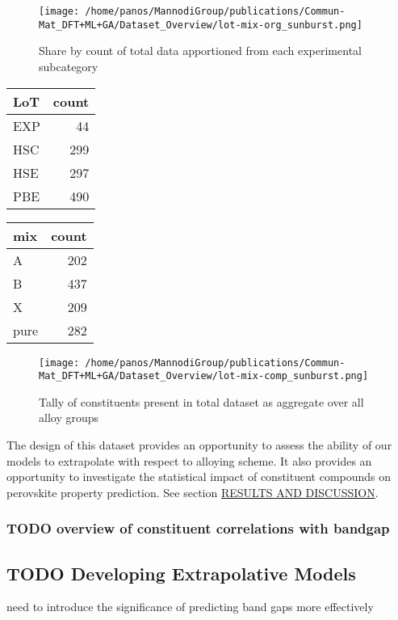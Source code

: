 \documentclass[aip, jmp, amsmath, amssymb]{revtex4-2}
\begin{document}
\begin{figure*}
\centering
\texttt{[image: /home/panos/MannodiGroup/publications/Commun-Mat\_DFT+ML+GA/Dataset\_Overview/lot-mix-org\_sunburst.png]}
\caption{\label{fig:lot_mix_org} Share by count of total data apportioned from each experimental subcategory}
\end{figure*}

\begin{center}
\begin{tabular}{lr}
LoT & count\\
\hline
EXP & 44\\
HSC & 299\\
HSE & 297\\
PBE & 490\\
\end{tabular}
\end{center}

\begin{center}
\begin{tabular}{lr}
mix & count\\
\hline
A & 202\\
B & 437\\
X & 209\\
pure & 282\\
\end{tabular}
\end{center}

\begin{figure*}
\centering
\texttt{[image: /home/panos/MannodiGroup/publications/Commun-Mat\_DFT+ML+GA/Dataset\_Overview/lot-mix-comp\_sunburst.png]}
\caption{\label{fig:comp} Tally of constituents present in total dataset as aggregate over all alloy groups}
\end{figure*}

The design of this dataset provides an opportunity to assess the
ability of our models to extrapolate with respect to alloying
scheme. It also provides an opportunity to investigate the statistical
impact of constituent compounds on perovskite property prediction. See
section \hyperref[sec:orgaa3d2ca]{RESULTS AND DISCUSSION}.
\subsubsection*{{\bfseries\sffamily TODO} overview of constituent correlations with bandgap}
\label{sec:org104c3f4}
\subsection*{{\bfseries\sffamily TODO} Developing Extrapolative Models}
\label{sec:org3aadd3f}
need to introduce the significance of predicting band gaps more
effectively
\end{document}
